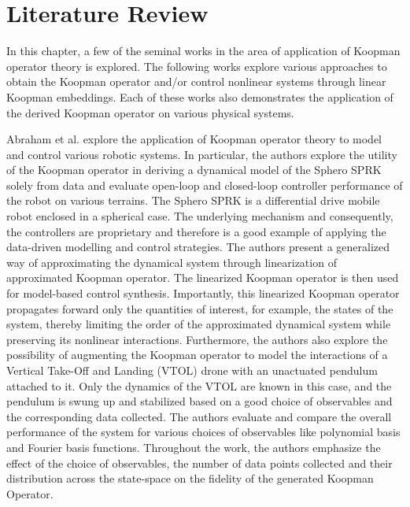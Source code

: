 \section{Literature Review}
\label{Chapter: Literature}
In this chapter, a few of the seminal works in the area of application of Koopman operator theory is explored. The following works explore various approaches to obtain the Koopman operator and/or control nonlinear systems through linear Koopman embeddings. Each of these works also demonstrates the application of the derived Koopman operator on various physical systems. 
\par
Abraham et al. \cite{Abraham} explore the application of Koopman operator theory to model and control various robotic systems. In particular, the authors explore the utility of the Koopman operator in deriving a dynamical model of the Sphero SPRK solely from data and evaluate open-loop and closed-loop controller performance of the robot on various terrains. The Sphero SPRK is a differential drive mobile robot enclosed in a spherical case. The underlying mechanism and consequently, the controllers are proprietary and therefore is a good example of applying the data-driven modelling and control strategies. The authors present a generalized way of approximating the dynamical system through linearization of approximated Koopman operator. The linearized Koopman operator is then used for model-based control synthesis. Importantly, this linearized Koopman operator propagates forward only the quantities of interest, for example, the states of the system, thereby limiting the order of the approximated dynamical system while preserving its nonlinear interactions. Furthermore, the authors also explore the possibility of augmenting the Koopman operator to model the interactions of a Vertical Take-Off and Landing (VTOL) drone with an unactuated pendulum attached to it. Only the dynamics of the VTOL are known in this case, and the pendulum is swung up and stabilized based on a good choice of observables and the corresponding data collected. The authors evaluate and compare the overall performance of the system for various choices of observables like polynomial basis and Fourier basis functions. Throughout the work, the authors emphasize the effect of the choice of observables, the number of data points collected and their distribution across the state-space on the fidelity of the generated Koopman Operator.
% 
% 
%
\par

